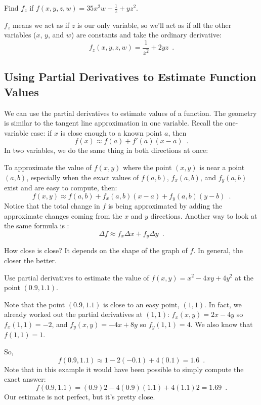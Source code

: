 \begin{example}
Find $f_z$ if $f(x,y,z,w)=35x^2w - \frac{1}{z}+yz^2$.

\begin{solution}
$f_z$ means we act as if $z$ is our only variable, so we'll act as if all the other variables ($x$, $y$, and $w$) are constants and take the ordinary derivative:
$$f_z(x,y,z,w) = \frac{1}{z^2} + 2yz \enspace .$$
\end{solution}\end{example}

\subsection{Using Partial Derivatives to Estimate Function Values}
We can use the partial derivatives to estimate values of a function. The geometry is similar to the tangent line approximation in one variable. Recall the one-variable case: if $x$ is close enough to a known point $a$, then
$$f(x)\approx   f(a)+f'(a)(x-a) \enspace .$$
In two variables, we do the same thing in both directions at once:

\begin{theorem}
To approximate the value of $f(x,y)$ where the point $(x, y)$ is near a point $(a,b)$, especially when the exact values of $f(a,b)$, $f_x(a, b)$, and $f_y(a, b)$ exist and are easy to compute, then:
$$f(x,y)\approx   f(a,b)+f_x(a,b)(x-a)+f_y(a,b)(y-b) \enspace .$$
Notice that the total change in $f$ is being approximated by adding the approximate changes coming from the $x$ and $y$ directions. Another way to look at the same formula is :
$$ \Delta f\approx   f_x\Delta x+f_y\Delta y \enspace . $$
\end{theorem}
How close is close? It depends on the shape of the graph of $f$. In general, the closer the better.

\begin{example}
Use partial derivatives to estimate the value of $f(x,y)=x^2-4xy+4y^2$ at the point $(0.9, 1.1)$.

\begin{solution}
  Note that the point $(0.9, 1.1)$ is close to an easy point, $(1, 1)$. In fact, we already worked out the partial derivatives at $(1, 1)$: $f_x(x,y)=2x-4y$ so $f_x(1,1)=-2$, and $f_y(x,y)=-4x+8y$ so $f_y(1,1)=4$. We also know that $f(1,1)=1$.

So,
$$f(0.9,1.1)\approx   1-2(-0.1)+4(0.1)=1.6 \enspace .$$
Note that in this example it would have been possible to simply compute the exact answer:
$$f(0.9,1.1)=(0.9)2-4(0.9)(1.1)+4(1.1)2=1.69 \enspace .$$
Our estimate is not perfect, but it's pretty close.
\end{solution}\end{example}

